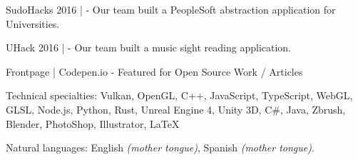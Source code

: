 \documentclass[10pt,a4paper]{article}
\begin{document}

\inlineheadsection %
{SudoHacks 2016 | }
{ - Our team built a PeopleSoft abstraction application for Universities.}

\inlineheadsection %
{UHack 2016 | }
{ - Our team built a music sight reading application.}

\inlineheadsection %
{Frontpage  | Codepen.io}
{ - Featured for Open Source Work / Articles}


\spacedhrule{1.6em}{-0.4em} %



\inlineheadsection %
{Technical specialties:}
{Vulkan, OpenGL, C++, JavaScript, TypeScript, WebGL, GLSL, Node.js, Python, Rust, Unreal Engine 4, Unity 3D, C\#, Java, Zbrush, Blender, PhotoShop, Illustrator, LaTeX}


\inlineheadsection %
{Natural languages:}
{English \textit{(mother tongue)}, Spanish \textit{(mother tongue)}.}


\spacedhrule{1.6em}{-0.4em} %
\end{document}
